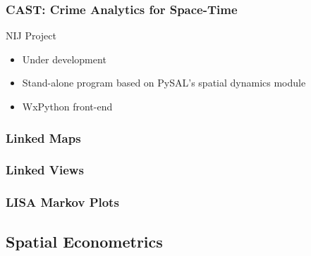 \documentclass{beamer}
\begin{document}
\begin{frame}\frametitle{CAST: Crime Analytics for Space-Time}
  \begin{block}{NIJ Project}
    \begin{itemize}
      \item Under development
      \item Stand-alone program based on PySAL's spatial dynamics module
      \item WxPython front-end
    \end{itemize}
  \end{block}
\end{frame}

\begin{frame}\frametitle{Linked Maps}
  
\begin{center}
     \begin{figure}
      \end{figure}      
\end{center}
\end{frame}

\begin{frame}\frametitle{Linked Views}
  
\begin{center}
     \begin{figure}
      \end{figure}      
\end{center}
\end{frame}

\begin{frame}\frametitle{LISA Markov Plots}
  
\begin{center}
     \begin{figure}
      \end{figure}      
\end{center}
\end{frame}


\subsection{Spatial  Econometrics}
\end{document}
